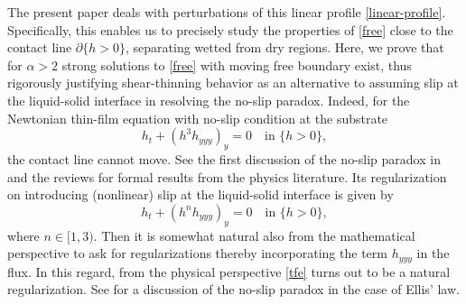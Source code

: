 \documentclass[reqno,12pt]{amsart}
\numberwithin{equation}{section}
\begin{document}
%
The present paper deals with perturbations of this linear profile \eqref{linear-profile}. Specifically, this enables us to precisely study the properties of \eqref{free} close to the contact line $\partial\{h > 0\}$, separating wetted from dry regions. Here, we prove that for $\alpha > 2$ strong solutions to \eqref{free} with moving free boundary exist, thus rigorously justifying shear-thinning behavior as an alternative to assuming slip at the liquid-solid interface in resolving the no-slip paradox. Indeed, for the Newtonian thin-film equation with no-slip condition at the substrate
%
\[
h_t + (h^3 h_{yyy})_y = 0 \quad \text{in } \{h > 0\},
\]
%
the contact line cannot move. See the first discussion of the no-slip paradox in \cite{HuhScriven1971} and the reviews \cite{deGennes1985,OronDavisBankoff1995,BonnEggers2009} for formal results from the physics literature. Its regularization on introducing (nonlinear) slip at the liquid-solid interface is given by
%
\begin{equation}\label{tfe-n}
h_t + (h^n h_{yyy})_y = 0 \quad \text{in } \{h > 0\},
\end{equation}
%
where $n \in [1,3)$. Then it is somewhat natural also from the mathematical perspective to ask for regularizations thereby incorporating the term $h_{yyy}$ in the flux. 
In this regard, from the physical perspective \eqref{tfe} turns out to be a natural regularization.
See \cite{WeidnerSchwartz1994,ansini_giacomelli_2002} for a discussion of the no-slip paradox in the case of Ellis' law.

%
\end{document}
